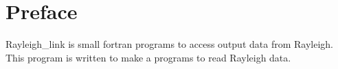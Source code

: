\documentclass[12pt]{article}
\begin{document}
%

%
%
%

\section*{Preface}
Rayleigh\_link is small fortran programs to access output data from Rayleigh. This program is written to make a programs to read Rayleigh data.


%
\newpage


%


%
%
%
%

%
%


\newpage
\begin{appendices}
%
\newpage

\end{appendices}
\end{document}
